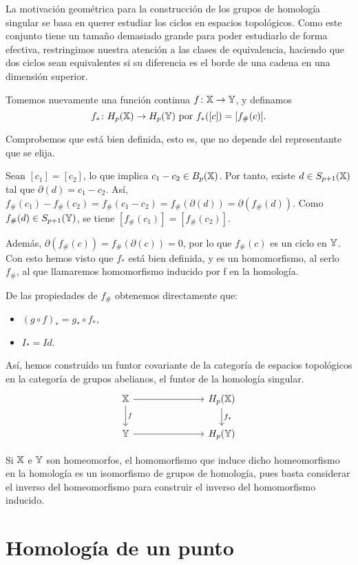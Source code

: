 La motivación geométrica para la construcción de los grupos de homología singular se basa en querer
estudiar los ciclos en espacios topológicos. Como este conjunto tiene un tamaño demasiado grande para
poder estudiarlo de forma efectiva, restringimos nuestra atención a las clases de equivalencia, haciendo
que dos ciclos sean equivalentes si su diferencia es el borde de una cadena en una dimensión superior.

Tomemos nuevamente una función continua $f \colon {\mathbb X} \to {\mathbb Y}$, y definamos
  \[ f_* \colon H_p({\mathbb X}) \to H_p({\mathbb Y}) \text{ por } f_*([c]) = [f_\#(c)]. \]

Comprobemos que está bien definida, esto es, que no depende del representante que se elija.

Sean $[c_1] = [c_2]$, lo que implica $c_1 - c_2 \in B_p({\mathbb X})$. Por tanto, existe $d \in S_{p+1}({\mathbb X})$ tal que $\partial(d) = c_1 - c_2$.
Así, $f_\#(c_1) - f_\#(c_2) = f_\#(c_1 - c_2) = f_\#(\partial(d)) = \partial(f_\#(d))$. Como $f_\#(d) \in S_{p+1}({\mathbb Y})$, se tiene $[f_\#(c_1)] = [f_\#(c_2)].$

Además, $\partial(f_\#(c)) = f_\#(\partial(c)) = 0$, por lo que $f_\#(c)$ es un ciclo en ${\mathbb Y}$. Con esto hemos visto que $f_*$ está bien definida,
y es un homomorfismo, al serlo $f_\#$, al que llamaremos homomorfismo inducido por f en la homología.

De las propiedades de $f_\#$ obtenemos directamente que:
\begin{itemize}
  \item $(g \circ f)_* = g_* \circ f_*$,
  \item $I_* = Id$.
\end{itemize}

Así, hemos construído un funtor covariante de la categoría de espacios topológicos en la categoría de grupos abelianos,
el funtor de la homología singular.
\[  \begin{tikzcd}
  \X \arrow{r} \arrow{d}{f} & [5em] H_p(\X) \arrow{d}{f_*} \\
  \Y \arrow{r}  & H_p(\Y)
\end{tikzcd} \]

Si ${\mathbb X}$ e ${\mathbb Y}$ son homeomorfos, el homomorfismo que induce dicho homeomorfismo en la homología es un isomorfismo de grupos de homología, pues
basta considerar el inverso del homeomorfismo para construir el inverso del homomorfismo inducido.

\section{Homología de un punto}

